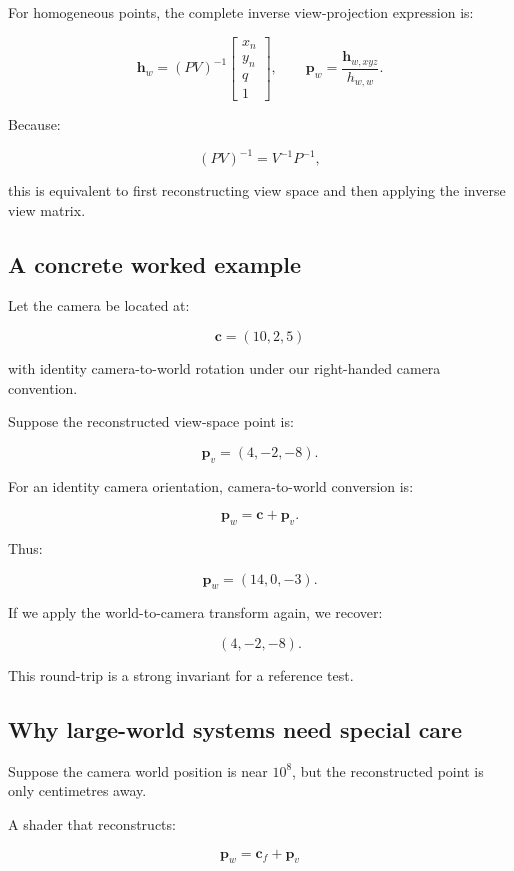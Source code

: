 For homogeneous points, the complete inverse view-projection expression is:

\[ \boxed{ \mathbf h_w=(PV)^{-1} \begin{bmatrix} x_n\\y_n\\q\\1 \end{bmatrix}, \qquad \mathbf p_w=\frac{\mathbf h_{w,xyz}}{h_{w,w}}. } \]

Because:

\[ (PV)^{-1}=V^{-1}P^{-1}, \]

this is equivalent to first reconstructing view space and then applying the inverse view matrix.

\subsection{A concrete worked example}\label{02-foundations-ii-ch035-a-concrete-worked-example}

Let the camera be located at:

\[ \mathbf c=(10,2,5) \]

with identity camera-to-world rotation under our right-handed camera convention.

Suppose the reconstructed view-space point is:

\[ \mathbf p_v=(4,-2,-8). \]

For an identity camera orientation, camera-to-world conversion is:

\[ \mathbf p_w=\mathbf c+\mathbf p_v. \]

Thus:

\[ \boxed{ \mathbf p_w=(14,0,-3). } \]

If we apply the world-to-camera transform again, we recover:

\[ (4,-2,-8). \]

This round-trip is a strong invariant for a reference test.

\subsection{Why large-world systems need special care}\label{02-foundations-ii-ch035-why-large-world-systems-need-special-care}

Suppose the camera world position is near \(10^8\), but the reconstructed point is only centimetres away.

A shader that reconstructs:

\[ \mathbf p_w=\mathbf c_f+\mathbf p_v \]

